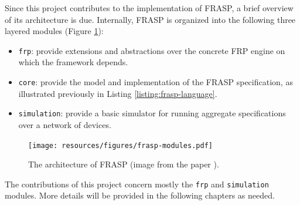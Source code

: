 Since this project contributes to the implementation of FRASP, a brief overview
of its architecture is due. Internally, FRASP is organized into the following
three layered modules (Figure \ref{figure:frasp-modules}):
\begin{itemize}
  \item \texttt{frp}: provide extensions and abstractions over the concrete
        \ac{FRP} engine on which the framework depends.
  \item \texttt{core}: provide the model and implementation of the FRASP
        specification, as illustrated previously in Listing
        \ref{listing:frasp-language}.
  \item \texttt{simulation}: provide a basic simulator for running aggregate
        specifications over a network of devices.
\end{itemize}
\begin{figure}[h]
  \centering
  \texttt{[image: resources/figures/frasp-modules.pdf]}
  \caption{The architecture of FRASP (image from the paper \cite{FRASP}).}
  \label{figure:frasp-modules}
\end{figure}

The contributions of this project concern mostly the \texttt{frp} and
\texttt{simulation} modules. More details will be provided in the following
chapters as needed.
